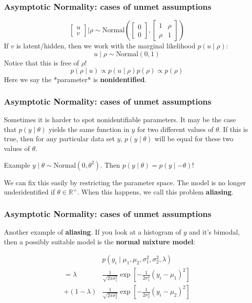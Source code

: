 \documentclass{beamer}
\begin{document}
\begin{frame}
\frametitle{Asymptotic Normality: cases of unmet assumptions}

\[
\left[\begin{array}{c}
u \\
v
\end{array}\right]
\bigg|
\rho
\sim
\text{Normal}\left( 
\left[\begin{array}{c}
0 \\
0
\end{array}\right]
,
\left[\begin{array}{cc}
1 & \rho \\
\rho & 1
\end{array}\right]
\right)
\]
If $v$ is latent/hidden, then we work with the marginal likelihood $p(u \mid \rho)$:
\[
u \mid \rho \sim \text{Normal}\left(0, 1 \right)
\]
Notice that this is free of $\rho$! 
\[
p(\rho \mid u) \propto p(u \mid \rho) p(\rho) \propto p(\rho)
\]
Here we say the *parameter* is {\bf nonidentified}.

\end{frame}

\begin{frame}
\frametitle{Asymptotic Normality: cases of unmet assumptions}

Sometimes it is harder to spot nonidentifiable parameters. It may be the case that $p(y \mid \theta)$ yields the same function in $y$ for two different values of $\theta$. If this is true, then for any particular data set $y$, $p(y \mid \theta)$ will be equal for these two values of $\theta$.
\newline

Example $y \mid \theta \sim \text{Normal}(0, \theta^2)$. Then $p(y \mid \theta) = p(y \mid -\theta)$!
\newline

We can fix this easily by restricting the parameter space. The model is no longer underidentified if $\theta \in \mathbb{R}^+$. When this happens, we call this problem {\bf aliasing}.

\end{frame}

\begin{frame}
\frametitle{Asymptotic Normality: cases of unmet assumptions}

Another example of {\bf aliasing}. If you look at a histogram of $y$ and it's bimodal, then a possibly suitable model is the {\bf normal mixture model}:

\begin{align*}
&p(y_i \mid \mu_1, \mu_2, \sigma_1^2, \sigma_2^2, \lambda) \\
= \lambda &\frac{1}{\sqrt{2\pi \sigma_1^2}} \exp\left[-\frac{1}{2 \sigma_1^2}(y_i - \mu_1)^2 \right] \\
+ (1-\lambda) &\frac{1}{\sqrt{2\pi \sigma_2^2}}\exp\left[-\frac{1}{2 \sigma_2^2}(y_i - \mu_2)^2 \right]
\end{align*}
\end{frame}
\end{document}
